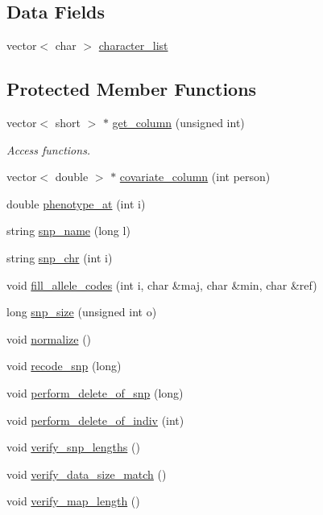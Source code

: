 \subsection*{Data Fields}
\begin{DoxyCompactItemize}
\item 
vector$<$ char $>$ \hyperlink{classSnpData_a3e88fcb82912de7cb1e37e2630bbee71}{character\_\-list}
\end{DoxyCompactItemize}
\subsection*{Protected Member Functions}
\begin{DoxyCompactItemize}
\item 
vector$<$ short $>$ $\ast$ \hyperlink{classSnpData_af114df61aa4280e4e89e87395b7a22f3}{get\_\-column} (unsigned int)
\begin{DoxyCompactList}\small\item\em Access functions. \item\end{DoxyCompactList}\item 
vector$<$ double $>$ $\ast$ \hyperlink{classSnpData_aadd312f6c8d9060a199728bf7e81a1fc}{covariate\_\-column} (int person)
\item 
double \hyperlink{classSnpData_a534016cfdc6e5ec19076a4f38d80dce2}{phenotype\_\-at} (int i)
\item 
string \hyperlink{classSnpData_a5a23514541160563ae68bf2b5a0e2355}{snp\_\-name} (long l)
\item 
string \hyperlink{classSnpData_aa4fa47c8134b674769f5638074ae46f8}{snp\_\-chr} (int i)
\item 
void \hyperlink{classSnpData_a1831ac542e4cad682c7235943e531179}{fill\_\-allele\_\-codes} (int i, char \&maj, char \&min, char \&ref)
\item 
long \hyperlink{classSnpData_a391d4c15ba2ee87318ffbb6b2f20b890}{snp\_\-size} (unsigned int o)
\item 
void \hyperlink{classSnpData_ad7f9a7e9b8635ae55b970786ce791b7b}{normalize} ()
\item 
void \hyperlink{classSnpData_afe4142e4ebec9142c79962b229208f7b}{recode\_\-snp} (long)
\item 
void \hyperlink{classSnpData_a7a1858e40b26cb6ded5d3e8009ed2b49}{perform\_\-delete\_\-of\_\-snp} (long)
\item 
void \hyperlink{classSnpData_a569da0a2d95bb510663ceb71717408e2}{perform\_\-delete\_\-of\_\-indiv} (int)
\item 
void \hyperlink{classSnpData_a0762cd9f5ff8576c8d7aee9550201f01}{verify\_\-snp\_\-lengths} ()
\item 
void \hyperlink{classSnpData_a726282a904cee0968dae7ef614ea16fe}{verify\_\-data\_\-size\_\-match} ()
\item 
void \hyperlink{classSnpData_ab0b29e53a209df1996e3dc008afb2f5b}{verify\_\-map\_\-length} ()
\end{DoxyCompactItemize}
